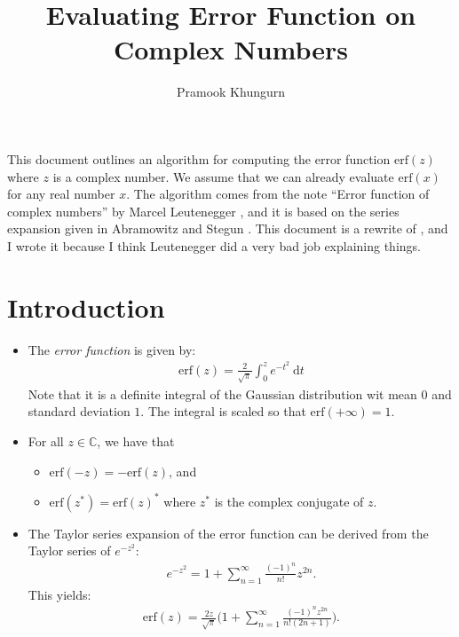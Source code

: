 \documentclass[10pt]{article}
\title{Evaluating Error Function on Complex Numbers}
\author{Pramook Khungurn}
\newcommand{\dee}{\mathrm{d}}
\newcommand{\erf}{\mathrm{erf}}
\begin{document}
	\maketitle
	
	This document outlines an algorithm for computing the error function $\erf(z)$ where $z$ is a complex number. We assume that we can already evaluate $\erf(x)$ for any real number $x$. The algorithm comes from the note ``Error function of complex numbers'' by Marcel Leutenegger \cite{leutenegger}, and it is based on the series expansion given in Abramowitz and Stegun \cite{abramowitz-stegun}. This document is a rewrite of \cite{leutenegger}, and I wrote it because I think Leutenegger did a very bad job explaining things.
	
	\section{Introduction}\label{sec:introduction} %
	\begin{itemize}
	  \item The \emph{error function} is given by:
	  \begin{align*}
	    \erf(z) = \frac{2}{\sqrt{\pi}} \int_{0}^z e^{-t^2}\ \dee t
	  \end{align*}
	  Note that it is a definite integral of the Gaussian distribution wit mean $0$ and standard deviation $1$. The integral is scaled so that $\erf(+\infty) = 1$.
	  
	  \item For all $z \in \mathbb{C}$, we have that
	  \begin{itemize}
	    \item $\erf(-z) = -\erf(z)$, and
	    \item $\erf(z^*) = \erf(z)^*$ where $z^*$ is the complex conjugate of $z$.
	  \end{itemize}
	  
	  \item The Taylor series expansion of the error function can be derived from the Taylor series of $e^{-z^2}$:
	  \begin{align*}
	    e^{-z^2} = 1 + \sum_{n=1}^\infty \frac{(-1)^n}{n!}z^{2n}.
	  \end{align*}
	  This yields:
	  \begin{align} \label{erf-taylor-series}
	    \erf(z) = \frac{2z}{\sqrt{\pi}}\bigg( 1 + \sum_{n=1}^\infty \frac{(-1)^n z^{2n}}{n!(2n+1)}\bigg).
	  \end{align}
	\end{itemize}
  
\end{document}

